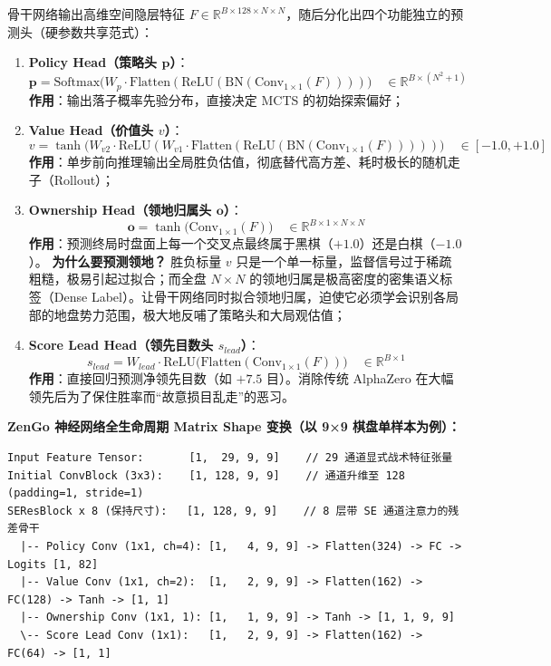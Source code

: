 \documentclass[11pt,a4paper]{ctexart}
\newcommand{\rb}[1]{\ensuremath{\mathbb{R}^{#1}}}
\begin{document}
骨干网络输出高维空间隐层特征 $F \in \rb{B \times 128 \times N \times N}$，随后分化出四个功能独立的预测头（硬参数共享范式）：
\begin{enumerate}
  \item \textbf{Policy Head（策略头 $\mathbf{p}$）}：
  \[ \mathbf{p} = \mathrm{Softmax}\bigl(W_p \cdot \mathrm{Flatten}(\mathrm{ReLU}(\mathrm{BN}(\mathrm{Conv}_{1\times 1}(F))))\bigr) \quad \in \rb{B \times (N^2+1)} \]
  \textbf{作用}：输出落子概率先验分布，直接决定 MCTS 的初始探索偏好；
  \item \textbf{Value Head（价值头 $v$）}：
  \[ v = \tanh\bigl(W_{v2} \cdot \mathrm{ReLU}(W_{v1} \cdot \mathrm{Flatten}(\mathrm{ReLU}(\mathrm{BN}(\mathrm{Conv}_{1\times 1}(F)))))\bigr) \quad \in [-1.0, +1.0] \]
  \textbf{作用}：单步前向推理输出全局胜负估值，彻底替代高方差、耗时极长的随机走子（Rollout）；
  \item \textbf{Ownership Head（领地归属头 $\mathbf{o}$）}：
  \[ \mathbf{o} = \tanh\bigl(\mathrm{Conv}_{1\times 1}(F)\bigr) \quad \in \rb{B \times 1 \times N \times N} \]
  \textbf{作用}：预测终局时盘面上每一个交叉点最终属于黑棋（$+1.0$）还是白棋（$-1.0$）。
  \textbf{为什么要预测领地？} 胜负标量 $v$ 只是一个单一标量，监督信号过于稀疏粗糙，极易引起过拟合；而全盘 $N \times N$ 的领地归属是极高密度的密集语义标签（Dense Label）。让骨干网络同时拟合领地归属，迫使它必须学会识别各局部的地盘势力范围，极大地反哺了策略头和大局观估值；
  \item \textbf{Score Lead Head（领先目数头 $s_{lead}$）}：
  \[ s_{lead} = W_{lead} \cdot \mathrm{ReLU}\bigl(\mathrm{Flatten}(\mathrm{Conv}_{1\times 1}(F))\bigr) \quad \in \rb{B \times 1} \]
  \textbf{作用}：直接回归预测净领先目数（如 $+7.5$ 目）。消除传统 AlphaZero 在大幅领先后为了保住胜率而“故意损目乱走”的恶习。
\end{enumerate}

\vspace{4pt}
\textbf{ZenGo 神经网络全生命周期 Matrix Shape 变换（以 9×9 棋盘单样本为例）：}
\begin{lstlisting}
Input Feature Tensor:       [1,  29, 9, 9]    // 29 通道显式战术特征张量
Initial ConvBlock (3x3):    [1, 128, 9, 9]    // 通道升维至 128 (padding=1, stride=1)
SEResBlock x 8 (保持尺寸):   [1, 128, 9, 9]    // 8 层带 SE 通道注意力的残差骨干
  |-- Policy Conv (1x1, ch=4): [1,   4, 9, 9] -> Flatten(324) -> FC -> Logits [1, 82]
  |-- Value Conv (1x1, ch=2):  [1,   2, 9, 9] -> Flatten(162) -> FC(128) -> Tanh -> [1, 1]
  |-- Ownership Conv (1x1, 1): [1,   1, 9, 9] -> Tanh -> [1, 1, 9, 9]
  \-- Score Lead Conv (1x1):   [1,   2, 9, 9] -> Flatten(162) -> FC(64) -> [1, 1]
\end{lstlisting}
\end{document}
